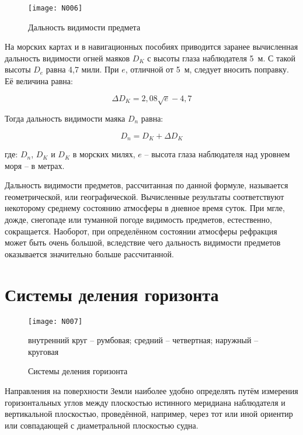 \begin{figure*}[htb]
  \centering{}
  \texttt{[image: N006]}
  \caption{Дальность видимости предмета}
  \label{fig:N6}
\end{figure*}

На морских картах и в навигационных пособиях приводится заранее
вычисленная дальность видимости огней маяков $D_K$ с высоты глаза
наблюдателя 5~м. С такой высоты $D_e$ равна 4,7 мили. При $e$,
отличной от 5~м, следует вносить поправку. Её величина равна:

\begin{equation}
  \Delta D_K = 2,08 \sqrt{e} - 4,7 
\end{equation}

Тогда дальность видимости маяка $D_n$ равна: 

\begin{equation}
  D_n = D_K +  \Delta D_K 
\end{equation}

где: $D_n$, $D_K$ и $D_K$ в морских милях, $e$ \--- высота глаза
наблюдателя над уровнем моря \--- в метрах.
 
Дальность видимости предметов, рассчитанная по данной формуле,
называется геометрической, или географической. Вычисленные результаты
соответствуют некоторому среднему состоянию атмосферы в дневное время
суток. При мгле, дожде, снегопаде или туманной погоде видимость
предметов, естественно, сокращается. Наоборот, при определённом
состоянии атмосферы рефракция может быть очень большой, вследствие
чего дальность видимости предметов оказывается значительно больше
рассчитанной.

\section{Системы деления горизонта}

\begin{figure}[htb]
  \centering{}
  \texttt{[image: N007]}
  \caption{Системы деления горизонта}
  \label{fig:N7}
  \small
  \centering{}
  внутренний круг \--- румбовая; средний \--- четвертная; наружный \--- круговая
\end{figure}

Направления на поверхности Земли наиболее удобно определять путём
измерения горизонтальных углов между плоскостью истинного меридиана
наблюдателя и вертикальной плоскостью, проведённой, например, через
тот или иной ориентир или совпадающей с диаметральной плоскостью
судна.

